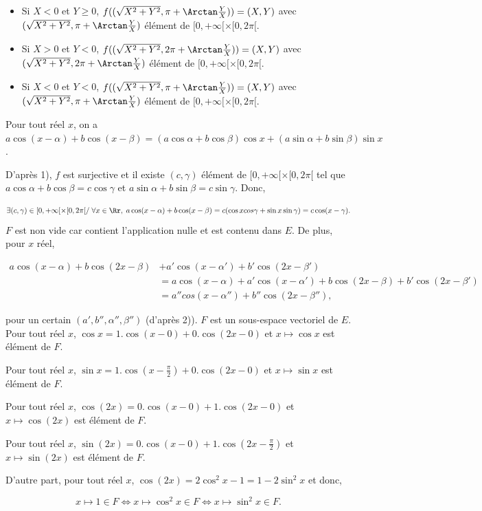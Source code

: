 {\begin{enumerate}
{\begin{itemize}
$[0,+\infty[\times[0,2\pi[$.
\item[-] Si $X<0$ et $Y\geq0$, $f((\sqrt{X^2+Y^2},\pi+\Arctan\frac{Y}{X}))=(X,Y)$ avec
$(\sqrt{X^2+Y^2},\pi+\Arctan\frac{Y}{X})$ élément de $[0,+\infty[\times[0,2\pi[$.
\item[-] Si $X>0$ et $Y<0$, $f((\sqrt{X^2+Y^2},2\pi+\Arctan\frac{Y}{X}))=(X,Y)$ avec $(\sqrt{X^2+Y^2},
2\pi+\Arctan\frac{Y}{X})$ élément de $[0,+\infty[\times[0,2\pi[$.
\item[-] Si $X<0$ et $Y<0$, $f((\sqrt{X^2+Y^2},\pi+\Arctan\frac{Y}{X}))=(X,Y)$ avec
$(\sqrt{X^2+Y^2},\pi+\Arctan\frac{Y}{X})$ élément de $[0,+\infty[\times[0,2\pi[$.
\end{itemize}
Pour tout réel $x$, on a $a\cos(x-\alpha)+b\cos(x-\beta)=(a\cos\alpha+b\cos\beta)\cos
x+(a\sin\alpha+b\sin\beta)\sin x$.

D'après 1), $f$ est surjective et il existe $(c,\gamma)$ élément de $[0,+\infty[\times[0,2\pi[$ tel que
$a\cos\alpha+b\cos\beta=c\cos\gamma$ et $a\sin\alpha+b\sin\beta=c\sin\gamma$. Donc,

$$\exists(c,\gamma)\in[0,+\infty[\times[0,2\pi[/\;\forall
x\in\Rr,\;a\cos(x-\alpha)+b\cos(x-\beta)=c(\cos xcos\gamma+\sin x\sin\gamma)=c\cos(x-\gamma).$$
$F$ est non vide car contient l'application nulle et est contenu dans $E$. De plus, pour $x$ réel,

\begin{align*}
a\cos(x-\alpha)+b\cos(2x-\beta)&+a'\cos(x-\alpha')+b'\cos(2x-\beta')\\
 &=a\cos(x-\alpha)+a'\cos(x-\alpha')+b\cos(2x-\beta)
+b'\cos(2x-\beta')\\
 &=a''cos(x-\alpha'')+b''\cos(2x-\beta''),
\end{align*}

pour un certain $(a',b'',\alpha'',\beta'')$ (d'après 2)). $F$ est un sous-espace vectoriel de $E$.
Pour tout réel $x$, $\cos x=1.\cos(x-0)+0.\cos(2x-0)$ et $x\mapsto\cos x$ est élément de $F$.

Pour tout réel $x$, $\sin x=1.\cos(x-\frac{\pi}{2})+0.\cos(2x-0)$ et $x\mapsto\sin x$ est élément de $F$.

Pour tout réel $x$, $\cos(2x)=0.\cos(x-0)+1.\cos(2x-0)$ et $x\mapsto\cos(2x)$ est élément de $F$.

Pour tout réel $x$, $\sin(2x)=0.\cos(x-0)+1.\cos(2x-\frac{\pi}{2})$ et $x\mapsto\sin(2x)$ est élément de $F$.

D'autre part, pour tout réel $x$, $\cos(2x)=2\cos^2x-1=1-2\sin^2x$ et donc,

$$x\mapsto1\in F\Leftrightarrow x\mapsto\cos^2x\in F\Leftrightarrow x\mapsto\sin^2x\in F.$$

}
\end{enumerate}}
